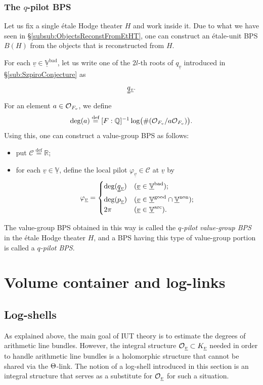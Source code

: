 \documentclass[12pt, reqno, a4paper]{amsart}
\def\udl#1{\underline{#1}} %
\def\eqdef{\stackrel{\textrm{def}}{=}} %
\def\bQ{\mathbb{Q}} %
\def\bR{\mathbb{R}} %
\def\bV{\mathbb{V}}
\def\cC{{\mathcal{C}}}
\def\uV{\udl{\bV}} %
\def\uv{\udl{v}} %
\def\bad{\mathrm{bad}}
\def\good{\mathrm{good}}
\def\non{\mathrm{non}}
\def\arc{\mathrm{arc}}
\begin{document}
\subsubsection{The $q$-pilot BPS}\label{subsub:qPilotBPS}
Let us fix a single \'etale Hodge theater $H$ and work inside it.
Due to what we have seen in \S\ref{subsub:ObjectsReconstFromEtHT}, one can construct an \'etale-unit BPS $B(H)$ from the objects that is reconstructed from $H$.

For each $\uv\in\uV^{\bad}$, let us write one of the $2l$-th roots of $q_{\uv}$ introduced in \S\ref{sub:SzpiroConjecture} as
$$
\uuqq_{\uv}.  
$$
For an element $a \in \OO_{F_v}$, we define 
$$
\deg(a) \eqdef [F:\bQ]^{-1}\log\bigl(\#(\OO_{F_v}/a\OO_{F_v})\bigr).
$$
Using this, one can construct a value-group BPS as follows:
\begin{itemize}
\item put $\cC\eqdef\bR$;
\item for each $\uv\in\uV$, define the local pilot $\varphi_{\uv} \in \cC$ at $\uv$ by
$$
\varphi_{\uv}=\begin{cases}\deg(\uuqq_{\uv}) & (\uv\in\uV^{\bad});\\ \deg(p_{\uv}) & (\uv\in\uV^{\good}\cap\uV^{\non});\\ 2\pi & (\uv\in\uV^{\arc}).\end{cases}
$$
\end{itemize}

The value-group BPS obtained in this way is called the \emph{$q$-pilot value-group BPS} in the \'etale Hodge theater $H$, and a BPS having this type of value-group portion is called a \emph{$q$-pilot BPS}.


\setcounter{equation}{0}
\section{Volume container and log-links}
\subsection{Log-shells}\label{sub:logShell}

As explained above, the main goal of IUT theory is to estimate the degrees of arithmetic line bundles. However, the integral structure $\OO_{\uv}\subset K_{\uv}$ needed in order to handle arithmetic line bundles is a holomorphic structure that cannot be shared via the $\Th$-link. The notion of a log-shell introduced in this section is an integral structure that serves as a substitute for $\OO_{\uv}$ for such a situation.
\end{document}
